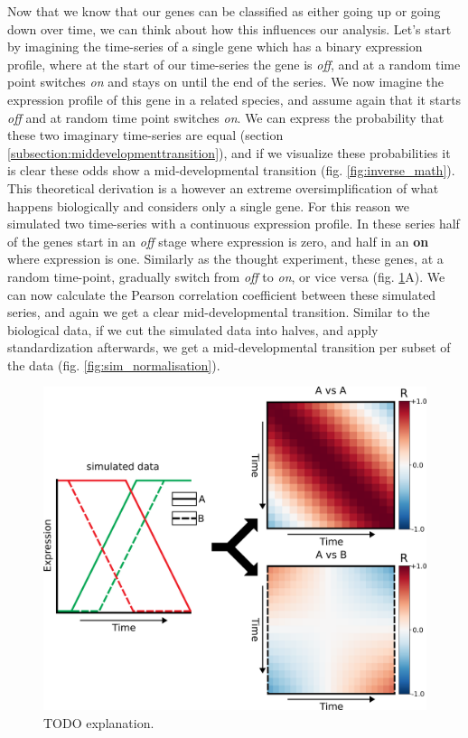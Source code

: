 Now that we know that our genes can be classified as either going up or going down over time, we can think about how this influences our analysis. Let's start by imagining the time-series of a single gene which has a binary expression profile, where at the start of our time-series the gene is \textit{off}, and at a random time point switches \textit{on} and stays on until the end of the series. We now imagine the expression profile of this gene in a related species, and assume again that it starts \textit{off} and at random time point switches \textit{on}. We can express the probability that these two imaginary time-series are equal (section \ref{subsection:middevelopmenttransition}), and if we visualize these probabilities it is clear these odds show a mid-developmental transition (fig. \ref{fig:inverse_math}). This theoretical derivation is a however an extreme oversimplification of what happens biologically and considers only a single gene. For this reason we simulated two time-series with a continuous expression profile. In these series half of the genes start in an \textit{off} stage where expression is zero, and half in an \textbf{on} where expression is one. Similarly as the thought experiment, these genes, at a random time-point, gradually switch from \textit{off} to \textit{on}, or vice versa (fig. \ref{fig:sim_explanation}A). We can now calculate the Pearson correlation coefficient between these simulated series, and again we get a clear mid-developmental transition. Similar to the biological data, if we cut the simulated data into halves, and apply standardization afterwards, we get a mid-developmental transition per subset of the data (fig. \ref{fig:sim_normalisation}). 

\begin{figure}[H]
    \includegraphics[width=\linewidth]{ch4.hourglass/images/sim_explanation.png}
    \caption{TODO explanation.}
    \label{fig:sim_explanation}
\end{figure}

